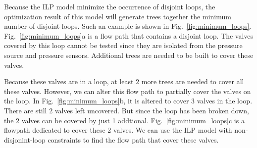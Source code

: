 Because the ILP model \text{(\ref{eq:ilp_1_ll})-(\ref{eq:ilp_2_ll})} minimize the occurrence of disjoint loops, the optimization result of this model will generate trees together the minimum number of disjoint loops. Such an example is shown in Fig.~\ref{fig:minimum_loops}. Fig.~\ref{fig:minimum_loops}a is a flow path that contains a disjoint loop. The valves covered by this loop cannot be tested since they are isolated from the pressure source and pressure sensors. Additional trees are needed to be built to cover these valves.

Because these valves are in a loop, at least 2 more trees are needed to cover all these valves. However, we can alter this flow path to partially cover the valves on the loop. In Fig.~\ref{fig:minimum_loops}b, it is altered to cover 3 valves in the loop. There are still 2 valves left uncovered. But since the loop has been broken down, the 2 valves can be covered by just 1 addtional. Fig.~\ref{fig:minimum_loops}c is a flowpath dedicated to cover these 2 valves. We can use the ILP model \text{(\ref{eq:ilp_1})-(\ref{eq:ilp_2})} with non-disjonint-loop constraints to find the flow path that cover these valves. 
\begin{figure*}[t]
{\figurefontsize
\centering

\caption{Eliminating a disjoint loop. (a)A flow path contains a disjoint loop. (c) Altered flow path partially covers valves in the loop. (d) An additional flow path is created to cover the valves left.}
\label{fig:minimum_loops}
}
\end{figure*}

